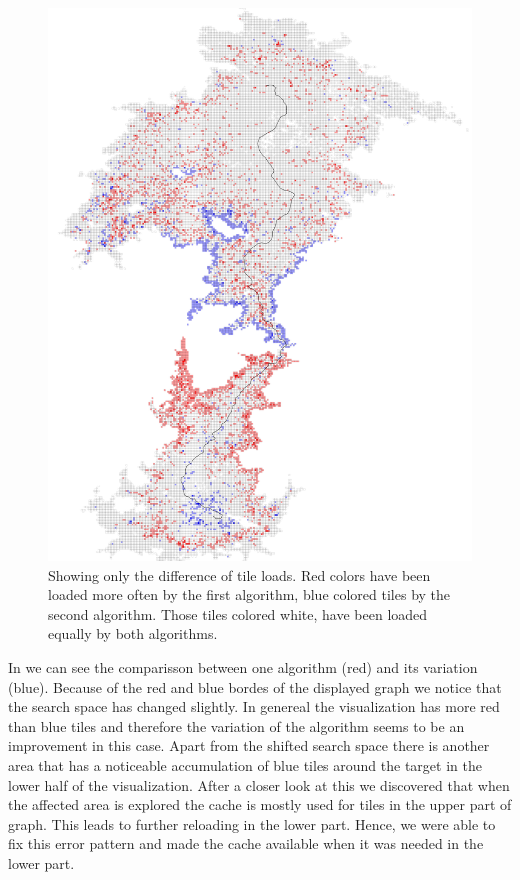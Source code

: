 \documentclass
[
    paper = a4,
    pagesize,
    12 pt,
    oneside,                       %
    open = right,
    DIV = calc,
    BCOR = 0 mm,                   %
    bibtotoc
]
{scrbook}
\begin{document}
\begin{figure}
    \includegraphics[width=\textwidth]{Images/vis-compare-colored.png}
\caption[]{Showing only the difference of tile loads. Red colors have been loaded more often by the first algorithm, blue colored tiles by the second algorithm. Those tiles colored white, have been loaded equally by both algorithms.}
\label{fig:difference}
\end{figure}

In   we can see the comparisson between one algorithm (red) and its variation (blue).
Because of the red and blue bordes of the displayed graph we notice that the search space has changed slightly.
In genereal the visualization has more red than blue tiles and therefore the variation of the algorithm seems to be an improvement in this case.
Apart from the shifted search space there is another area that has a noticeable accumulation of blue tiles around the target in the lower half of the visualization.
After a closer look at this we discovered that when the affected area is explored the cache is mostly used for tiles in the upper part of graph.
This leads to further reloading in the lower part.
Hence, we were able to fix this error pattern and made the cache available when it was needed in the lower part.
\end{document}
